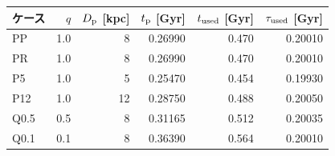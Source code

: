 \begin{tabular}{lrrrrr}\toprule
ケース & $q$ & $D_{\rm p}$ [kpc] & $t_{\rm p}$ [Gyr] & $t_{\rm used}$ [Gyr] & $\tau_{\rm used}$ [Gyr] \\
\midrule
PP & 1.0 & 8 & 0.26990 & 0.470 & 0.20010 \\
PR & 1.0 & 8 & 0.26990 & 0.470 & 0.20010 \\
P5 & 1.0 & 5 & 0.25470 & 0.454 & 0.19930 \\
P12 & 1.0 & 12 & 0.28750 & 0.488 & 0.20050 \\
Q0.5 & 0.5 & 8 & 0.31165 & 0.512 & 0.20035 \\
Q0.1 & 0.1 & 8 & 0.36390 & 0.564 & 0.20010 \\
\bottomrule\end{tabular}
